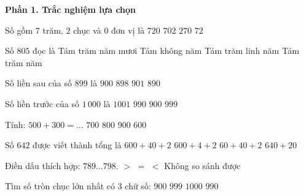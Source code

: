 \textbf{Phần 1. Trắc nghiệm lựa chọn}

\begin{ex} %
Số gồm $7$ trăm, $2$ chục và $0$ đơn vị là
\choice
{\True $720$}
{$702$}
{$270$}
{$72$}
\end{ex}

\begin{ex} %
Số $805$ đọc là
\choice
{Tám trăm năm mươi}
{Tám không năm}
{\True Tám trăm linh năm}
{Tám trăm năm}
\end{ex}

\begin{ex} %
Số liền sau của số $899$ là
\choice
{\True $900$}
{$898$}
{$901$}
{$890$}
\end{ex}

\begin{ex} %
Số liền trước của số $1\,000$ là
\choice
{$1001$}
{$990$}
{$900$}
{\True $999$}
\end{ex}

\begin{ex} %
Tính: $500 + 300 = \dots$
\choice
{$700$}
{\True $800$}
{$900$}
{$600$}
\end{ex}

\begin{ex} %
Số $642$ được viết thành tổng là
\choice
{\True $600 + 40 + 2$}
{$600 + 4 + 2$}
{$60 + 40 + 2$}
{$640 + 20$}
\end{ex}

\begin{ex} %
Điền dấu thích hợp: $789 \dots 798$.
\choice
{$>$}
{$=$}
{\True $<$}
{Không so sánh được}
\end{ex}

\begin{ex} %
Tìm số tròn chục lớn nhất có 3 chữ số:
\choice
{$900$}
{$999$}
{$1000$}
{\True $990$}
\end{ex}

